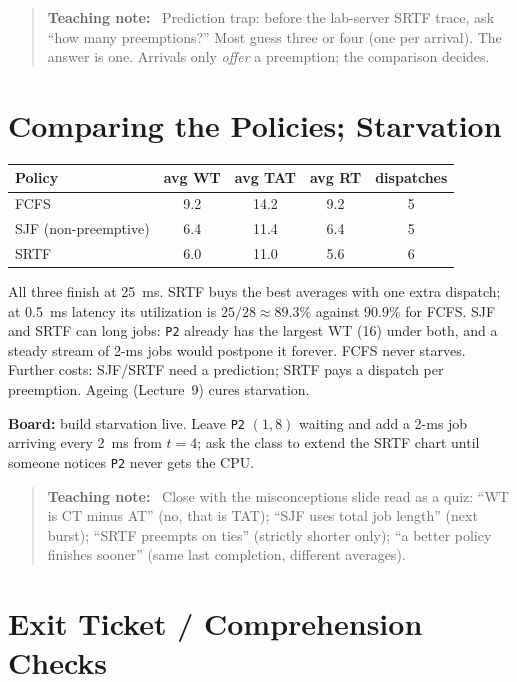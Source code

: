 \documentclass[11pt]{article}
\newenvironment{teachingaside}{\begin{quote}\small\color{primary-gold}\textbf{Teaching note:}\ }{\end{quote}}
\begin{document}
\begin{teachingaside}
Prediction trap: before the lab-server SRTF trace, ask ``how many preemptions?'' Most guess three or four (one per arrival). The answer is one. Arrivals only \emph{offer} a preemption; the comparison decides.
\end{teachingaside}

\section{Comparing the Policies; Starvation}

\begin{center}
\begin{tabular}{lcccc}
\toprule
Policy & avg WT & avg TAT & avg RT & dispatches \\
\midrule
FCFS & 9.2 & 14.2 & 9.2 & 5 \\
SJF (non-preemptive) & 6.4 & 11.4 & 6.4 & 5 \\
SRTF & 6.0 & 11.0 & 5.6 & 6 \\
\bottomrule
\end{tabular}
\end{center}

All three finish at 25~ms. SRTF buys the best averages with one extra dispatch; at 0.5~ms latency its utilization is $25/28 \approx 89.3\%$ against $90.9\%$ for FCFS. SJF and SRTF can  long jobs: \texttt{P2} already has the largest WT (16) under both, and a steady stream of 2-ms jobs would postpone it forever. FCFS never starves. Further costs: SJF/SRTF need a prediction; SRTF pays a dispatch per preemption. Ageing (Lecture~9) cures starvation.

\textbf{Board:} build starvation live. Leave \texttt{P2} $(1, 8)$ waiting and add a 2-ms job arriving every 2~ms from $t = 4$; ask the class to extend the SRTF chart until someone notices \texttt{P2} never gets the CPU.

\begin{teachingaside}
Close with the misconceptions slide read as a quiz: ``WT is CT minus AT'' (no, that is TAT); ``SJF uses total job length'' (next burst); ``SRTF preempts on ties'' (strictly shorter only); ``a better policy finishes sooner'' (same last completion, different averages).
\end{teachingaside}

\section{Exit Ticket / Comprehension Checks}
\end{document}
